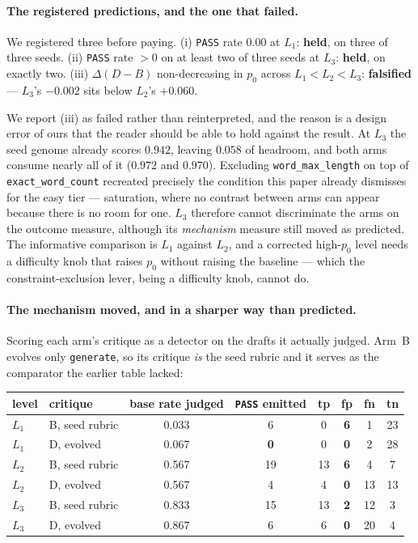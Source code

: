 \documentclass[11pt]{article}
\newcommand{\dd}{\ensuremath{\Delta}}
\begin{document}
\paragraph{The registered predictions, and the one that failed.} We registered three before
paying. (i) \texttt{PASS} rate $0.00$ at $L_1$: \textbf{held}, on three of three seeds.
(ii) \texttt{PASS} rate $>0$ on at least two of three seeds at $L_3$: \textbf{held}, on exactly
two. (iii) $\dd(D-B)$ non-decreasing in $p_0$ across $L_1 < L_2 < L_3$: \textbf{falsified} ---
$L_3$'s $-0.002$ sits below $L_2$'s $+0.060$.

We report (iii) as failed rather than reinterpreted, and the reason is a design error of ours
that the reader should be able to hold against the result. At $L_3$ the seed genome already
scores $0.942$, leaving $0.058$ of headroom, and both arms consume nearly all of it ($0.972$ and
$0.970$). Excluding \texttt{word\_max\_length} on top of \texttt{exact\_word\_count} recreated
precisely the condition this paper already dismisses for the easy tier --- saturation, where no
contrast between arms can appear because there is no room for one. $L_3$ therefore cannot
discriminate the arms on the outcome measure, although its \emph{mechanism} measure still moved
as predicted. The informative comparison is $L_1$ against $L_2$, and a corrected high-$p_0$
level needs a difficulty knob that raises $p_0$ without raising the baseline --- which the
constraint-exclusion lever, being a difficulty knob, cannot do.

\paragraph{The mechanism moved, and in a sharper way than predicted.} Scoring each arm's
critique as a detector on the drafts it actually judged. Arm~B evolves only \texttt{generate},
so its critique \emph{is} the seed rubric and it serves as the comparator the earlier table
lacked:

\begin{center}\small
\begin{tabular}{llcccccc}
\toprule
level & critique & base rate judged & \texttt{PASS} emitted & tp & \textbf{fp} & fn & tn \\
\midrule
$L_1$ & B, seed rubric   & 0.033 & 6  & 0  & \textbf{6} & 1  & 23 \\
$L_1$ & D, evolved       & 0.067 & \textbf{0}  & 0  & \textbf{0} & 2  & 28 \\
$L_2$ & B, seed rubric   & 0.567 & 19 & 13 & \textbf{6} & 4  & 7 \\
$L_2$ & D, evolved       & 0.567 & 4  & 4  & \textbf{0} & 13 & 13 \\
$L_3$ & B, seed rubric   & 0.833 & 15 & 13 & \textbf{2} & 12 & 3 \\
$L_3$ & D, evolved       & 0.867 & 6  & 6  & \textbf{0} & 20 & 4 \\
\bottomrule
\end{tabular}
\end{center}
\end{document}
